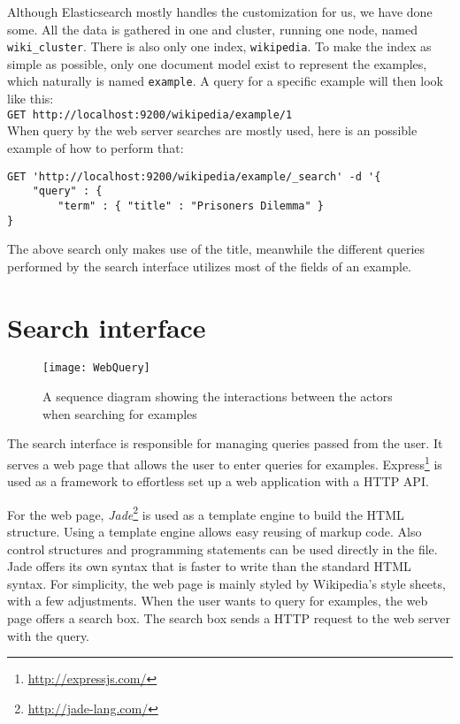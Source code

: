 Although Elasticsearch mostly handles the customization for us, we have done some. All the data is gathered in one and cluster, running one node, named \texttt{wiki\_cluster}. There is also only one index, \texttt{wikipedia}. To make the index as simple as possible, only one document model exist to represent the examples, which naturally is named \texttt{example}. A query for a specific example will then look like this:\\
\texttt{GET http://localhost:9200/wikipedia/example/1}\\
When query by the web server searches are mostly used, here is an possible example of how to perform that:
\begin{verbatim}
GET 'http://localhost:9200/wikipedia/example/_search' -d '{
    "query" : {
        "term" : { "title" : "Prisoners Dilemma" }
}
\end{verbatim}
The above search only makes use of the title, meanwhile the different queries performed by the search interface utilizes most of the fields of an example.


\section{Search interface}

\begin{figure}[H] 
\caption{A sequence diagram showing the interactions between the actors when searching for examples}
\texttt{[image: WebQuery]}
\label{fig:web_query}
\end{figure}

The search interface is responsible for managing queries passed from the user. It serves a web page that allows the user to enter queries for examples. Express\footnote{\url{http://expressjs.com/}} is used as a framework to effortless set up a web application with a HTTP API.

For the web page, \textit{Jade}\footnote{\url{http://jade-lang.com/}} is used as a template engine to build the HTML structure. Using a template engine allows easy reusing of markup code. Also control structures and programming statements can be used directly in the file. Jade offers its own syntax that is faster to write than the standard HTML syntax. For simplicity, the web page is mainly styled by Wikipedia's style sheets, with a few adjustments. When the user wants to query for examples, the web page offers a search box. The search box sends a HTTP request to the web server with the query.

